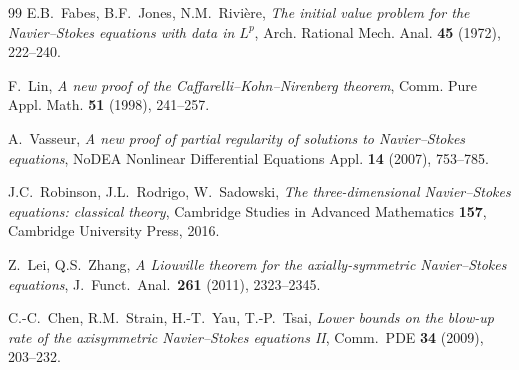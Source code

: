 \documentclass[11pt]{article}
\theoremstyle{definition}
\theoremstyle{remark}
\begin{document}
\begin{thebibliography}{99}
E.B.~Fabes, B.F.~Jones, N.M.~Rivi\`ere,
\textit{The initial value problem for the Navier--Stokes equations with data in $L^p$},
Arch. Rational Mech. Anal. \textbf{45} (1972), 222--240.

F.~Lin,
\textit{A new proof of the Caffarelli--Kohn--Nirenberg theorem},
Comm. Pure Appl. Math. \textbf{51} (1998), 241--257.

A.~Vasseur,
\textit{A new proof of partial regularity of solutions to Navier--Stokes equations},
NoDEA Nonlinear Differential Equations Appl. \textbf{14} (2007), 753--785.

J.C.~Robinson, J.L.~Rodrigo, W.~Sadowski,
\textit{The three-dimensional Navier--Stokes equations: classical theory},
Cambridge Studies in Advanced Mathematics \textbf{157},
Cambridge University Press, 2016.

Z.~Lei, Q.S.~Zhang,
\textit{A Liouville theorem for the axially-symmetric Navier--Stokes equations},
J.\ Funct.\ Anal.\ \textbf{261} (2011), 2323--2345.

C.-C.~Chen, R.M.~Strain, H.-T.~Yau, T.-P.~Tsai,
\textit{Lower bounds on the blow-up rate of the axisymmetric Navier--Stokes
equations II},
Comm.\ PDE \textbf{34} (2009), 203--232.

\end{thebibliography}
\end{document}
